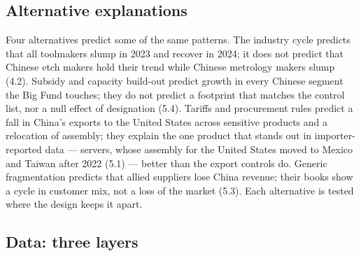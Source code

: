 \documentclass[12pt]{article}
\begin{document}
\subsection{Alternative explanations}

Four alternatives predict some of the same patterns. The industry cycle predicts that all toolmakers slump in 2023 and recover in 2024; it does not predict that Chinese etch makers hold their trend while Chinese metrology makers slump (4.2). Subsidy and capacity build-out predict growth in every Chinese segment the Big Fund touches; they do not predict a footprint that matches the control list, nor a null effect of designation (5.4). Tariffs and procurement rules predict a fall in China's exports to the United States across sensitive products and a relocation of assembly; they explain the one product that stands out in importer-reported data --- servers, whose assembly for the United States moved to Mexico and Taiwan after 2022 (5.1) --- better than the export controls do. Generic fragmentation predicts that allied suppliers lose China revenue; their books show a cycle in customer mix, not a loss of the market (5.3). Each alternative is tested where the design keeps it apart.

\subsection{Data: three layers}
\end{document}
